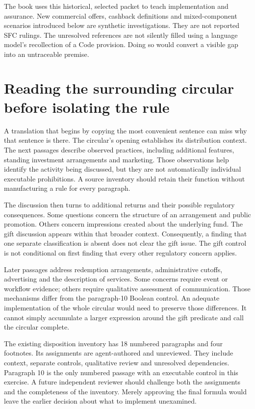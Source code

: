 The book uses this historical, selected packet to teach implementation and
assurance. New commercial offers, cashback definitions and mixed-component
scenarios introduced below are synthetic investigations. They are not reported
SFC rulings. The unresolved references are not silently filled using a language
model's recollection of a Code provision. Doing so would convert a visible gap
into an untraceable premise.

\section{Reading the surrounding circular before isolating the rule}
\label{sec:circular-context}
A translation that begins by copying the most convenient sentence can miss why
that sentence is there. The circular's opening establishes its distribution
context. The next passages describe observed practices, including additional
features, standing investment arrangements and marketing. Those observations
help identify the activity being discussed, but they are not automatically
individual executable prohibitions. A source inventory should retain their
function without manufacturing a rule for every paragraph.

The discussion then turns to additional returns and their possible regulatory
consequences. Some questions concern the structure of an arrangement and public
promotion. Others concern impressions created about the underlying fund. The
gift discussion appears within that broader context. Consequently, a finding
that one separate classification is absent does not clear the gift issue. The
gift control is not conditional on first finding that every other regulatory
concern applies.

Later passages address redemption arrangements, administrative cutoffs,
advertising and the description of services. Some concerns require event or
workflow evidence; others require qualitative assessment of communication.
Those mechanisms differ from the paragraph-10 Boolean control. An adequate
implementation of the whole circular would need to preserve those differences.
It cannot simply accumulate a larger expression around the gift predicate and
call the circular complete.

The existing disposition inventory has 18 numbered paragraphs and four
footnotes. Its assignments are agent-authored and unreviewed. They include
context, separate controls, qualitative review and unresolved dependencies.
Paragraph 10 is the only numbered passage with an executable control in this
exercise. A future independent reviewer should challenge both the assignments
and the completeness of the inventory. Merely approving the final formula would
leave the earlier decision about what to implement unexamined.

